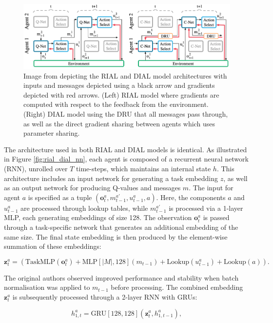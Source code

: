 \documentclass{article}
\begin{document}
\begin{figure}
	\centering
	\includegraphics[scale=0.5]{images/rial_dial.png}
	\caption{Image from \citet{foerster2016learning} depicting the RIAL and DIAL model architectures with inputs and messages depicted using a black arrow and gradients depicted with red arrows. (Left) RIAL model where gradients are computed with respect to the feedback from the environment. (Right) DIAL model using the DRU that all messages pass through, as well as the direct gradient sharing between agents which uses parameter sharing.}
\end{figure}

The architecture used in both RIAL and DIAL models is identical. As illustrated in Figure \ref{fig:rial_dial_nn}, each agent is composed of a recurrent neural network (RNN), unrolled over \( T \) time-steps, which maintains an internal state \( h \). This architecture includes an input network for generating a task embedding \( z \), as well as an output network for producing Q-values and messages \( m \). The input for agent \( a \) is specified as a tuple \( (\mathbf{o}_t^a, m_{t-1}^{a'}, u_{t-1}^a, a) \). Here, the components \( a \) and \( u_{t-1}^a \) are processed through lookup tables, while \( m_{t-1}^{a'} \) is processed via a 1-layer MLP, each generating embeddings of size 128. The observation \( \mathbf{o}_t^a \) is passed through a task-specific network that generates an additional embedding of the same size. The final state embedding is then produced by the element-wise summation of these embeddings:

$$
\mathbf{z}_t^a = (\text{TaskMLP}(\mathbf{o}_t^a) + \text{MLP}[|M|, 128](m_{t-1}) + \text{Lookup}(u_{t-1}^a) + \text{Lookup}(a)).
$$

The original authors observed improved performance and stability when batch normalisation \citep{ioffe2015batch} was applied to \( m_{t-1} \) before processing. The combined embedding \( \mathbf{z}_t^a \) is subsequently processed through a 2-layer RNN with GRUs:

$$
h_{1, t}^a = \text{GRU}[128, 128](\mathbf{z}_t^a, h_{1, t-1}^a),
$$
\end{document}

